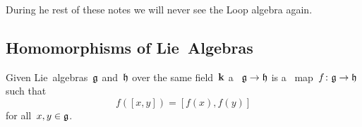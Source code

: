 \begin{remark}
  During he rest of these notes we will never see the Loop algebra again.
\end{remark}





\subsection{Homomorphisms of Lie~Algebras}


\begin{definition}
 Given Lie~algebras~$\mathfrak{g}$ and~$\mathfrak{h}$ over the same field~$\kf$ a ~$\mathfrak{g} \to \mathfrak{h}$ is a~{\linear{$\kf$}} map~$f \colon \mathfrak{g} \to \mathfrak{h}$ such that
 \[
  f([x,y])
  =
  [f(x),f(y)]
 \]
 for all~$x, y \in \mathfrak{g}$.
\end{definition}


